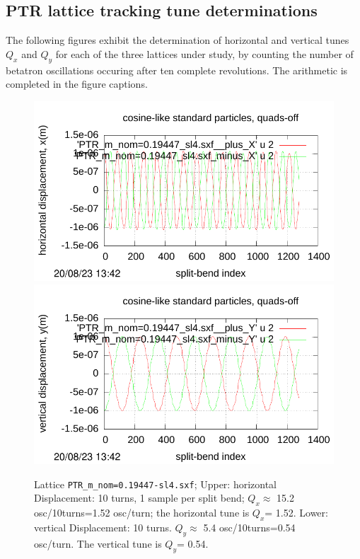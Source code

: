 \documentclass[12pt]{article}
\begin{document}
\subsection{PTR lattice tracking tune determinations}
The following figures exhibit the determination of horizontal and vertical tunes $Q_x$ and $Q_y$  for each of 
the three lattices under study, by counting the number of betatron oscillations occuring after ten
complete revolutions.  The arithmetic is completed in the figure captions.
%
\begin{figure}[htbp]
  \includegraphics[scale=0.65]{pdf/Fig-p19-t.pdf}
  \includegraphics[scale=0.65]{pdf/Fig-p19-b.pdf} 
\caption{Lattice {\tt PTR\_m\_nom=0.19447-sl4.sxf}; Upper: horizontal Displacement: 10 turns, 
1 sample per split bend; $Q_x\approx$ 15.2 osc/10turns=1.52 osc/turn; the horizontal tune is $Q_x$= 1.52. 
Lower: vertical Displacement: 10 turns. $Q_y\approx$ 
5.4 osc/10turns=0.54 osc/turn. The vertical tune is $Q_y$= 0.54.}
\end{figure}
%
%
\end{document}
